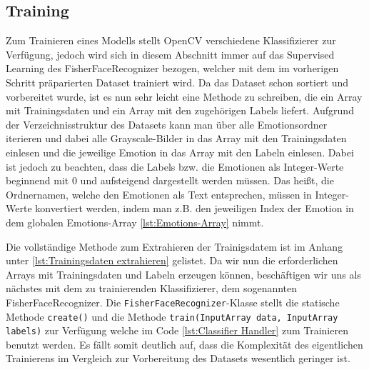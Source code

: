 \documentclass[12pt, a4paper]{report}
\begin{document}
\subsection{Training}
Zum Trainieren eines Modells stellt OpenCV verschiedene Klassifizierer zur Verfügung, jedoch wird sich in diesem Abschnitt immer auf das Supervised Learning des FisherFaceRecognizer bezogen, welcher mit dem im vorherigen Schritt präparierten Dataset trainiert wird. Da das Dataset schon sortiert und vorbereitet wurde, ist es nun sehr leicht eine Methode zu schreiben, die ein Array mit Trainingsdaten und ein Array mit den zugehörigen Labels liefert. Aufgrund der Verzeichnisstruktur des Datasets kann man über alle Emotionsordner iterieren und dabei alle Grayscale-Bilder in das Array mit den Trainingsdaten einlesen und die jeweilige Emotion in das Array mit den Labeln einlesen. Dabei ist jedoch zu beachten, dass die Labels bzw. die Emotionen als Integer-Werte beginnend mit 0 und aufsteigend dargestellt werden müssen. Das heißt, die Ordnernamen, welche den Emotionen als Text entsprechen, müssen in Integer-Werte konvertiert werden, indem man z.B. den jeweiligen Index der Emotion in dem globalen Emotions-Array \ref{lst:Emotions-Array} nimmt.

Die vollständige Methode zum Extrahieren der Trainigsdatem ist im Anhang unter \ref{lst:Trainingsdaten extrahieren} gelistet. 
Da wir nun die erforderlichen Arrays mit Trainingsdaten und Labeln erzeugen können, beschäftigen wir uns als nächstes mit dem zu trainierenden Klassifizierer, dem sogenannten FisherFaceRecognizer. Die \texttt{FisherFaceRecognizer}-Klasse stellt die statische Methode \texttt{create()} und die Methode \texttt{train(InputArray data, InputArray labels)} zur Verfügung welche im Code \ref{lst:Classifier Handler} zum Trainieren benutzt werden. Es fällt somit deutlich auf, dass die Komplexität des eigentlichen Trainierens im Vergleich zur Vorbereitung des Datasets wesentlich geringer ist.
\end{document}
